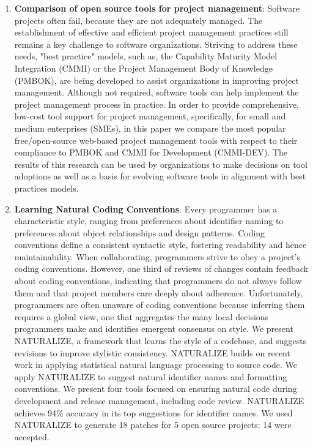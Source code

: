 \begin{englishtext}
\begin{enumerate}
    \item \textbf{Comparison of open source tools for project management}:
    Software projects often fail, because they are not adequately managed. The
    establishment of effective and efficient project management practices still
    remains a key challenge to software organizations. Striving to address these
    needs, "best practice" models, such as, the Capability Maturity Model
    Integration (CMMI) or the Project Management Body of Knowledge (PMBOK), are
    being developed to assist organizations in improving project management.
    Although not required, software tools can help implement the project
    management process in practice. In order to provide comprehensive, low-cost
    tool support for project management, specifically, for small and medium
    enterprises (SMEs), in this paper we compare the most popular
    free/open-source web-based project management tools with respect to their
    compliance to PMBOK and CMMI for Development (CMMI-DEV). The results of this
    research can be used by organizations to make decisions on tool adoptions as
    well as a basis for evolving software tools in alignment with best practices
    models. \cite{toolsForProjectManagement}

    \item \textbf{Learning Natural Coding Conventions}: Every programmer has a
    characteristic style, ranging from preferences about identifier naming to
    preferences about object relationships and design patterns. Coding
    conventions define a consistent syntactic style, fostering readability and
    hence maintainability. When collaborating, programmers strive to obey a
    project’s coding conventions. However, one third of reviews of changes
    contain feedback about coding conventions, indicating that programmers do
    not always follow them and that project members care deeply about adherence.
    Unfortunately, programmers are often unaware of coding conventions because
    inferring them requires a global view, one that aggregates the many local
    decisions programmers make and identifies emergent consensus on style. We
    present NATURALIZE, a framework that learns the style of a codebase, and
    suggests revisions to improve stylistic consistency. NATURALIZE builds on
    recent work in applying statistical natural language processing to source
    code. We apply NATURALIZE to suggest natural identifier names and formatting
    conventions. We present four tools focused on ensuring natural code during
    development and release management, including code review. NATURALIZE
    achieves 94\% accuracy in its top suggestions for identifier names. We used
    NATURALIZE to generate 18 patches for 5 open source projects: 14 were
    accepted. \cite{naturalCodingConventions}


\end{enumerate}
\end{englishtext}
